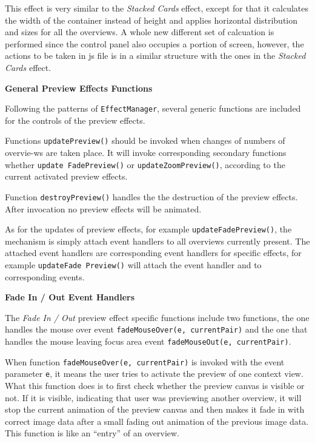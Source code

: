 This effect is very similar to the \emph{Stacked Cards} effect, except for that it calculates the width of the container instead of height and applies horizontal distribution and sizes for all the overviews. A whole new different set of calcuation is performed since the control panel also occupies a portion of screen, however, the actions to be taken in \gls{js} file is in a similar structure with the ones in the \emph{Stacked Cards} effect.

\textbf{General Preview Effects Functions}

Following the patterns of \texttt{EffectManager}, several generic functions are included for the controls of the preview effects.

Functions \texttt{updatePreview()} should be invoked when changes of numbers of overvie-ws are taken place. It will invoke corresponding secondary functions whether \texttt{update FadePreview()} or \texttt{updateZoomPreview()}, according to the current activated preview effects.

Function \texttt{destroyPreview()} handles the the destruction of the preview effects. After invocation no preview effects will be animated.

As for the updates of preview effects, for example \texttt{updateFadePreview()}, the mechanism is simply attach event handlers to all overviews currently present. The attached event handlers are corresponding event handlers for specific effects, for example \texttt{updateFade Preview()} will attach the event handler  and  to corresponding events.

\textbf{Fade In / Out Event Handlers}

The \emph{Fade In / Out} preview effect specific functions include two functions, the one handles the mouse over event \texttt{fadeMouseOver(e, currentPair)} and the one that handles the mouse leaving focus area event \texttt{fadeMouseOut(e, currentPair)}.

When function \texttt{fadeMouseOver(e, currentPair)} is invoked with the event parameter \texttt{e}, it means the user tries to activate the preview of one context view. What this function does is to first check whether the preview canvas is visible or not. If it is visible, indicating that user was previewing another overview, it will stop the current animation of the preview canvas and then makes it fade in with correct image data after a small fading out animation of the previous image data. This function is like an ``entry'' of an overview.

